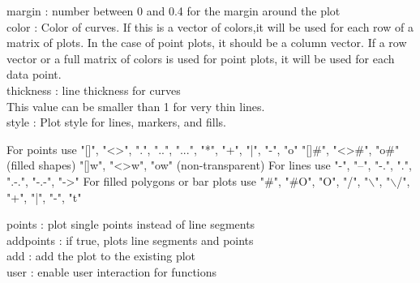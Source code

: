 \documentclass[a4paper,10pt]{article}
\begin{document}
\begin{eulernotebook}
\begin{eulercomment}
\begin{eulercomment}
\begin{eulercomment}
\begin{eulercomment}
\begin{eulercomment}
\begin{eulercomment}
\begin{eulercomment}
\begin{eulercomment}
\begin{eulercomment}
\begin{eulercomment}
\begin{eulercomment}
\begin{eulercomment}
\begin{eulercomment}
\begin{eulercomment}
\begin{eulercomment}
\begin{eulercomment}
\begin{eulercomment}
\begin{eulercomment}
\begin{eulercomment}
\begin{eulercomment}
\begin{eulercomment}
\begin{eulercomment}
\begin{eulercomment}
\begin{eulercomment}
\begin{eulercomment}
\begin{eulercomment}
\begin{eulercomment}
\begin{eulercomment}
\begin{eulercomment}
\begin{eulercomment}
\begin{eulercomment}
\begin{eulercomment}
\begin{eulercomment}
\begin{eulercomment}
\begin{eulercomment}
\begin{eulercomment}
\begin{eulercomment}
\begin{eulercomment}
\begin{eulercomment}
margin    : number between 0 and 0.4 for the margin around the plot\\
color     : Color of curves. If this is a vector of colors,it will be
used for each row of a matrix of plots. In the case of point plots, it
should be a column vector. If a row vector or a full matrix of colors
is used for point plots, it will be used for each data point.\\
thickness : line thickness for curves\\
This value can be smaller than 1 for very thin lines.\\
style     : Plot style for lines, markers, and fills.\\
\end{eulercomment}
\begin{eulerttcomment}
            For points use
            "[]", "<>", ".", "..", "...",
            "*", "+", "|", "-", "o"
            "[]#", "<>#", "o#" (filled shapes)
            "[]w", "<>w", "ow" (non-transparent)
            For lines use
            "-", "--", "-.", ".", ".-.", "-.-", "->"
            For filled polygons or bar plots use
            "#", "#O", "O", "/", "\(\backslash\)", "\(\backslash\)/",
            "+", "|", "-", "t"
\end{eulerttcomment}
\begin{eulercomment}
points    : plot single points instead of line segments\\
addpoints : if true, plots line segments and points\\
add       : add the plot to the existing plot\\
user      : enable user interaction for functions\\

\end{eulercomment}
\end{eulercomment}
\end{eulercomment}
\end{eulercomment}
\end{eulercomment}
\end{eulercomment}
\end{eulercomment}
\end{eulercomment}
\end{eulercomment}
\end{eulercomment}
\end{eulercomment}
\end{eulercomment}
\end{eulercomment}
\end{eulercomment}
\end{eulercomment}
\end{eulercomment}
\end{eulercomment}
\end{eulercomment}
\end{eulercomment}
\end{eulercomment}
\end{eulercomment}
\end{eulercomment}
\end{eulercomment}
\end{eulercomment}
\end{eulercomment}
\end{eulercomment}
\end{eulercomment}
\end{eulercomment}
\end{eulercomment}
\end{eulercomment}
\end{eulercomment}
\end{eulercomment}
\end{eulercomment}
\end{eulercomment}
\end{eulercomment}
\end{eulercomment}
\end{eulercomment}
\end{eulercomment}
\end{eulercomment}
\end{eulernotebook}
\end{document}
